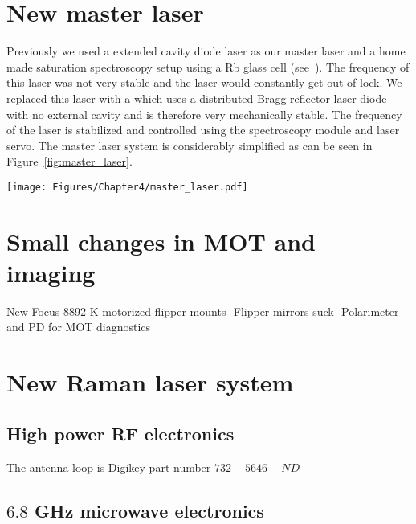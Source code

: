 \section{New master laser}
Previously we used a  extended cavity diode laser as our master laser and a home made saturation spectroscopy setup using a Rb glass cell (see~\cite{CampbellThesis,PriceThesis}). The frequency of this laser was not very stable and the laser would constantly get out of lock. We replaced this laser with a  which uses a distributed Bragg reflector laser diode with no external cavity and is therefore very mechanically stable. The frequency of the laser is stabilized and controlled using the  spectroscopy module and  laser servo. The master laser system is considerably simplified as can be seen in Figure~\ref{fig:master_laser}.

\begin{figure*}[htb]
\begin{center}
\texttt{[image: Figures/Chapter4/master\_laser.pdf]}
\caption[Water cooling manifold schematic]{}
\label{fig:master_laser}
\end{center}
\end{figure*}

\section{Small changes in MOT and imaging}

New Focus 8892-K motorized flipper mounts
-Flipper mirrors suck
-Polarimeter and PD for MOT diagnostics


\section{New Raman laser system}
\label{sec:Raman_laser}




\subsection{High power RF electronics}
\label{sec:high_power_rf_antenna}
The antenna loop is Digikey part number $732-5646-ND$

\subsection{$6.8$ GHz microwave electronics}

